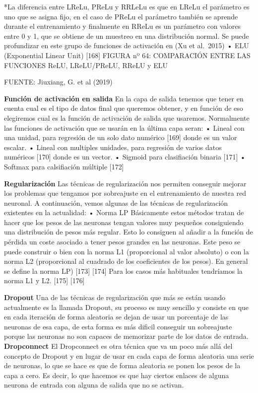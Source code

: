 \documentclass[
  a4paper,
  DIV=11,
  numbers=noendperiod]{scrreprt}
\begin{document}
*La diferencia entre LReLu, PReLu y RRLeLu es que en LReLu el parámetro
es uno que se asigna fijo, en el caso de PReLu el parámetro también se
aprende durante el entrenamiento y finalmente en RReLu es un parámetro
con valores entre 0 y 1, que se obtiene de un muestreo en una
distribución normal. Se puede profundizar en este grupo de funciones de
activación en (Xu et al.~2015) • ELU (Exponential Linear Unit) {[}168{]}
FIGURA nº 64: COMPARACIÓN ENTRE LAS FUNCIONES ReLU, LReLU/PReLU, RReLU y
ELU

FUENTE: Jiuxiang, G. et al (2019)

\textbf{Función de activación en salida} En la capa de salida tenemos
que tener en cuenta cual es el tipo de datos final que queremos obtener,
y en función de eso elegiremos cual es la función de activación de
salida que usaremos. Normalmente las funciones de activación que se
usarán en la última capa seran: • Lineal con una unidad, para regresión
de un solo dato numérico {[}169{]} donde es un valor escalar. • Lineal
con multiples unidades, para regresión de varios datos numéricos
{[}170{]} donde es un vector. • Sigmoid para clasifiación binaria
{[}171{]} • Softmax para calsifiación múltiple {[}172{]}

\textbf{Regularización} Las técnicas de regularización nos permiten
conseguir mejorar los problemas que tengamos por sobreajuste en el
entrenamiento de nuestra red neuronal. A continuación, vemos algunas de
las técnicas de regularización existentes en la actualidad: • Norma LP
Básicamente estos métodos tratan de hacer que los pesos de las neuronas
tengan valores muy pequeños consiguiendo una distribución de pesos más
regular. Esto lo consiguen al añadir a la función de pérdida un coste
asociado a tener pesos grandes en las neuronas. Este peso se puede
construir o bien con la norma L1 (proporcional al valor absoluto) o con
la norma L2 (proporcional al cuadrado de los coeficientes de los pesos).
En general se define la norma LP) {[}173{]} {[}174{]} Para los casos más
habituales tendríamos la norma L1 y L2. {[}175{]} {[}176{]}

\textbf{Dropout} Una de las técnicas de regularización que más se están
usando actualmente es la llamada Dropout, su proceso es muy sencillo y
consiste en que en cada iteración de forma aleatoria se dejan de usar un
porcentaje de las neuronas de esa capa, de esta forma es más dificil
conseguir un sobreajuste porque las neuronas no son capaces de memorizar
parte de los datos de entrada. \textbf{Dropconnect} El Dropconnect es
otra técnica que va un poco más allá del concepto de Dropout y en lugar
de usar en cada capa de forma aleatoria una serie de neuronas, lo que se
hace es que de forma aleatoria se ponen los pesos de la capa a cero. Es
decir, lo que hacemos es que hay ciertos enlaces de alguna neurona de
entrada con alguna de salida que no se activan.
\end{document}
